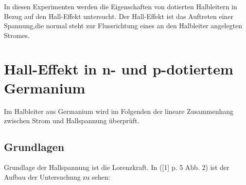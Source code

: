 \documentclass[12pt,a4paper]{article}
\begin{document}
\begin{multicols}{2}




%			



In diesen Experimenten werden die Eigenschaften von dotierten Halbleitern in Bezug auf den Hall-Effekt untersucht. Der Hall-Effekt ist das Auftreten einer Spannung,die normal steht zur Flussrichtung eines an den Halbleiter angelegten Stromes.\\


\section{Hall-Effekt in n- und p-dotiertem Germanium}
Im Halbleiter aus Germanium wird im Folgenden der lineare Zusammenhang zwischen Strom und Hallspannung überprüft.

\subsection{Grundlagen}
Grundlage der Hallspannung ist die Lorenzkraft. In ([1] p. 5 Abb. 2) ist der Aufbau der Untersuchung zu sehen:


\end{multicols}
\end{document}
